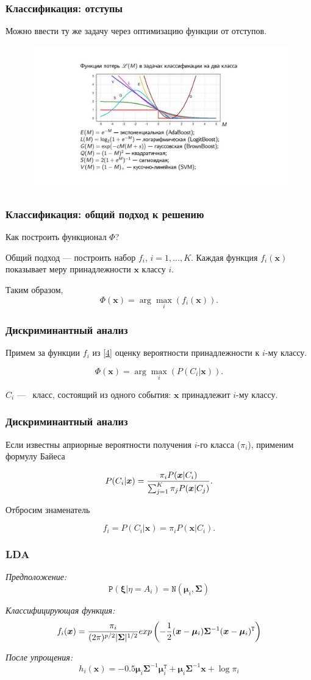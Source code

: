 \documentclass[11pt]{beamer}
\begin{document}
	\begin{frame}
		\frametitle{Классификация: отступы}
		Можно ввести ту же задачу через оптимизацию функции от отступов.
		\begin{figure}
			\centering
			\includegraphics[width=0.7\linewidth]{../Report/imgs/lossfuns}

			\label{fig:margins}
		\end{figure}
	\end{frame}

	\begin{frame}
		\frametitle{Классификация: общий подход к решению}
		Как построить функционал $\Phi$?
		
		
		Общий подход --- построить набор $f_i$, $i = 1, \ldots, K$. Каждая функция $f_i(\bm{x})$ показывает меру принадлежности $\bm{x}$ классу $i$. 
		
		Таким образом,
		\begin{equation}
			\Phi(\bm{x}) = \arg\max_i(f_i(\bm{x})).
			\label{4}
		\end{equation}
	\end{frame}
	\begin{frame}
		\frametitle{Дискриминантный анализ}
		Примем за функции $f_i$ из \ref{4} оценку вероятности принадлежности к $i$-му классу.
		
		$$\Phi(\bm{x}) = \arg\max_i (P(C_i|\bm{x})).$$
		
		$C_i$ ---  класс, состоящий из одного события: $\bm{x}$ принадлежит $i$-му классу.
	\end{frame}
	\begin{frame}
		\frametitle{Дискриминантный анализ}
		Если известны априорные вероятности получения $i$-го класса ($\pi_i$), применим формулу Байеса
		
		$$P(C_i|\bm{x}) = {{\pi_i P(\bm{x}|C_i)}\over{\sum_{j=1}^{K} \pi_j P(\bm{x}|C_j)}}.$$
		 
		 Отбросим знаменатель
		
		$$f_i = P(C_i|\bm{x}) = \pi_i P(\bm{x}|C_i).$$
	\end{frame}
	\begin{frame}
		\frametitle{LDA}
		\textit{Предположение:}	
		$$\mathtt{P}(\bm{\xi}|\eta = A_i) = \mathtt{N}(\bm{\mu}_i, \bm{\Sigma})$$
		
		\textit{Классифицирующая функция:}
		$$f_i(\bm{x}) = {{\pi_i}\over{(2\pi)^{p/2}|\bm{\Sigma}|^{1/2}}}exp\left(-{{1}\over{2}}(\bm{x} - \bm{\mu}_i)\bm{\Sigma}^{-1}(\bm{x} - \bm{\mu}_i)^\mathtt{T}\right)$$
		
		\textit{После упрощения:}
		$$h_i(\bm{x}) = -0.5 \bm{\mu}_i\bm{\Sigma}^{-1}\bm{\mu}_i^\mathtt{T} + \bm{\mu}_i\bm{\Sigma}^{-1}\bm{x} + \log\pi_i$$

	\end{frame}
\end{document}
